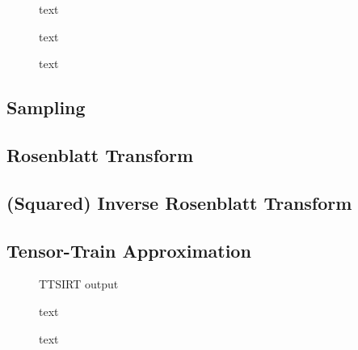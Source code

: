 \begin{figure}[h]
	\centering
	\scalebox{0.66}{}
	\caption[]{text}
	\label{fig:Results}
\end{figure}


\begin{figure}[h]
	\centering
	\scalebox{0.66}{}
	\caption[]{text}
	\label{fig:Results}
\end{figure}


\begin{figure}[h]
	\centering
	\scalebox{0.66}{}
	\caption[]{text}
	\label{fig:Results}
\end{figure}



\subsection{Sampling}

\subsection{ Rosenblatt Transform}
\subsection{(Squared) Inverse Rosenblatt Transform}
\subsection{Tensor-Train Approximation}

\begin{figure}[h]
	\centering
	\scalebox{0.66}{}
	\caption[]{TTSIRT output}
	\label{fig:Results}
\end{figure}
\begin{figure}[h]
	\centering
	\scalebox{0.66}{}
	\caption[]{text}
	\label{fig:Results}
\end{figure}

\begin{figure}[h]
	\centering
	\scalebox{0.66}{}
	\caption[]{text}
	\label{fig:Results}
\end{figure}



